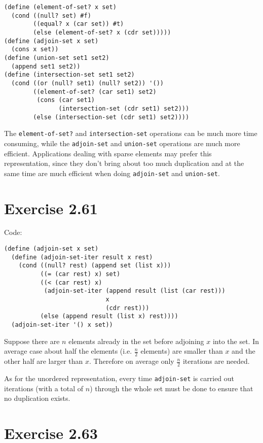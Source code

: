 \documentclass[../main.tex]{subfiles}
\begin{document}
\begin{lstlisting}
(define (element-of-set? x set)
  (cond ((null? set) #f)
        ((equal? x (car set)) #t)
        (else (element-of-set? x (cdr set)))))
(define (adjoin-set x set)
  (cons x set))
(define (union-set set1 set2)
  (append set1 set2))
(define (intersection-set set1 set2)
  (cond ((or (null? set1) (null? set2)) '())
        ((element-of-set? (car set1) set2)
         (cons (car set1)
               (intersection-set (cdr set1) set2)))
        (else (intersection-set (cdr set1) set2))))
\end{lstlisting}

The \lstinline{element-of-set?} and
 \lstinline{intersection-set} operations
 can be much more time consuming, while the
 \lstinline{adjoin-set} and \lstinline{union-set}
 operations are much more efficient.
 Applications dealing with sparse elements
 may prefer this representation, since they
 don't bring about too much duplication and
 at the same time are much efficient when
 doing \lstinline{adjoin-set} and \lstinline{union-set}.

\section{Exercise 2.61}

Code:

\begin{lstlisting}
(define (adjoin-set x set)
  (define (adjoin-set-iter result x rest)
    (cond ((null? rest) (append set (list x)))
          ((= (car rest) x) set)
          ((< (car rest) x)
           (adjoin-set-iter (append result (list (car rest)))
                            x
                            (cdr rest)))
          (else (append result (list x) rest))))
  (adjoin-set-iter '() x set))
\end{lstlisting}

Suppose there are $n$ elements already in the set
 before adjoining $x$ into the set. In average case
 about half the elements (i.e. $\frac{n}{2}$ elements)
 are smaller than $x$ and the other half are larger
 than $x$. Therefore on average only $\frac{n}{2}$
 iterations are needed.

As for the unordered representation, every time
 \lstinline{adjoin-set} is carried out iterations
 (with a total of $n$)
 through the whole set must be done to ensure
 that no duplication exists.

\section{Exercise 2.63}
\end{document}

